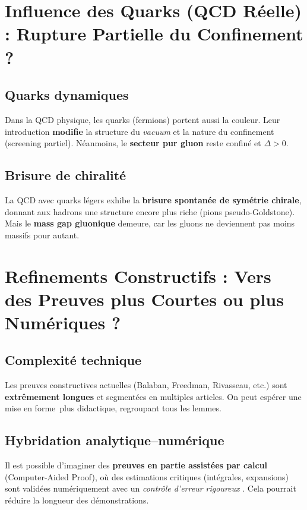 \section{Influence des Quarks (QCD Réelle) : Rupture Partielle du Confinement ?}
\label{sec:11.2}

\subsection*{Quarks dynamiques}
Dans la QCD physique, les quarks (fermions) portent aussi la couleur. Leur introduction \textbf{modifie} la structure du \emph{vacuum} et la nature du confinement (screening partiel). Néanmoins, le \textbf{secteur pur gluon} reste confiné et \(\Delta>0\).

\subsection*{Brisure de chiralité}
La QCD avec quarks légers exhibe la \textbf{brisure spontanée de symétrie chirale}, donnant aux hadrons une structure encore plus riche (pions pseudo-Goldstone). Mais le \textbf{mass gap gluonique} demeure, car les gluons ne deviennent pas moins massifs pour autant.

\vspace{1em}

\section{Refinements Constructifs : Vers des Preuves plus Courtes ou plus Numériques ?}
\label{sec:11.3}

\subsection*{Complexité technique}
Les preuves constructives actuelles (Balaban, Freedman, Rivasseau, etc.) sont \textbf{extrêmement longues} et segmentées en multiples articles. On peut espérer une \og mise en forme\fg\ plus didactique, regroupant tous les lemmes.

\subsection*{Hybridation analytique–numérique}
Il est possible d’imaginer des \textbf{preuves en partie assistées par calcul} (Computer-Aided Proof), où des estimations critiques (intégrales, expansions) sont validées numériquement avec un \emph{contrôle d’erreur rigoureux} \cite{CAPjones}. Cela pourrait réduire la longueur des démonstrations.

